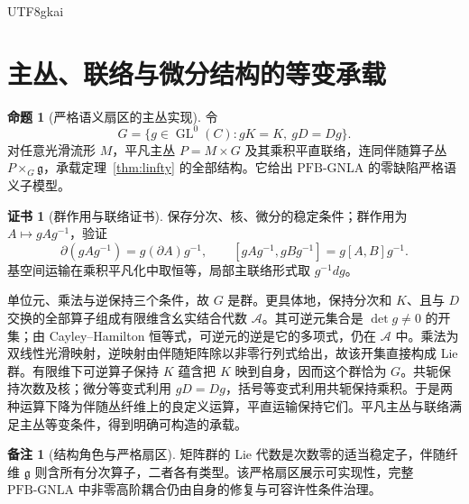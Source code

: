 \documentclass[12pt]{report}
\makeatletter
\theoremstyle{definition}
\newtheorem{proposition}{命题}[chapter]
\newtheorem{remark}{备注}[chapter]
\newtheorem{Certificate}{证书}[chapter]
\renewenvironment{proof}[1][\proofname]{\par
  \pushQED{\qed}\normalfont
  \topsep6\p@\@plus6\p@\relax
  \trivlist
  \item[\hskip\labelsep\normalfont #1\@addpunct{.}]\ignorespaces
}{
  \popQED\endtrivlist\@endpefalse
}
\newcommand{\GL}{\operatorname{GL}}
\newcommand{\PFB}{\mathrm{PFB\mbox{-}GNLA}}
\makeatother
\begin{document}
\begin{CJK*}{UTF8}{gkai}
\section{主丛、联络与微分结构的等变承载}
\begin{proposition}[严格语义扇区的主丛实现]
\label{prop:bundle}
令
\[
G=\{g\in\GL^0(C):gK=K,\ gD=Dg\}.
\]
对任意光滑流形 \(M\)，平凡主丛 \(P=M\times G\) 及其乘积平直联络，连同伴随算子丛 \(P\times_{G}\mathfrak g\)，承载定理~\ref{thm:linfty} 的全部结构。它给出 \(\PFB\) 的零缺陷严格语义子模型。
\end{proposition}
\begin{Certificate}[群作用与联络证书]
保存分次、核、微分的稳定条件；群作用为 \(A\mapsto gAg^{-1}\)，验证
\[
\partial(gAg^{-1})=g(\partial A)g^{-1},\qquad
[gAg^{-1},gBg^{-1}]=g[A,B]g^{-1}.
\]
基空间运输在乘积平凡化中取恒等，局部主联络形式取 \(g^{-1}dg\)。
\end{Certificate}
\begin{proof}
单位元、乘法与逆保持三个条件，故 \(G\) 是群。更具体地，保持分次和 \(K\)、且与 \(D\) 交换的全部算子组成有限维含幺实结合代数 \(\mathcal A\)。其可逆元集合是 \(\det g\ne0\) 的开集；由 Cayley--Hamilton 恒等式，可逆元的逆是它的多项式，仍在 \(\mathcal A\) 中。乘法为双线性光滑映射，逆映射由伴随矩阵除以非零行列式给出，故该开集直接构成 Lie 群。有限维下可逆算子保持 \(K\) 蕴含把 \(K\) 映到自身，因而这个群恰为 \(G\)。共轭保持次数及核；微分等变式利用 \(gD=Dg\)，括号等变式利用共轭保持乘积。于是两种运算下降为伴随丛纤维上的良定义运算，平直运输保持它们。平凡主丛与联络满足主丛等变条件，得到明确可构造的承载。
\end{proof}
\begin{remark}[结构角色与严格扇区]
矩阵群的 Lie 代数是次数零的适当稳定子，伴随纤维 \(\mathfrak g\) 则含所有分次算子，二者各有类型。该严格扇区展示可实现性，完整 \(\PFB\) 中非零高阶耦合仍由自身的修复与可容许性条件治理\cite{pure,app3}。
\end{remark}


\end{CJK*}
\end{document}
